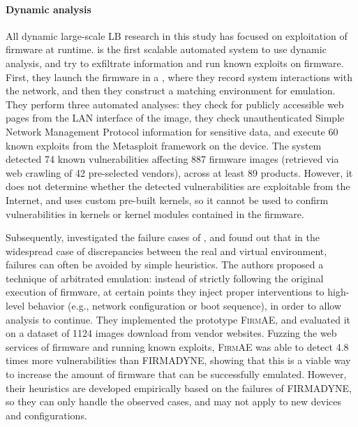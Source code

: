 \paragraph{Dynamic analysis}
All dynamic large-scale LB research in this study has focused on exploitation of firmware at runtime.
 is the first scalable automated system to use dynamic analysis, and try to exfiltrate information and run known exploits on firmware.
First, they launch the firmware in a , where they record system interactions with the network, and then they construct a matching environment for emulation.
They perform three automated analyses: they check for publicly accessible web pages from the LAN interface of the image, they check unauthenticated Simple Network Management Protocol information for sensitive data, and execute \num{60} known exploits from the Metasploit framework on the device.
The system detected \num{74} known vulnerabilities affecting \num{887} firmware images (retrieved via web crawling of \num{42} pre-selected vendors), across at least \num{89} products.
However, it does not determine whether the detected vulnerabilities are exploitable from the Internet, and uses custom pre-built kernels, so it cannot be used to confirm vulnerabilities in kernels or kernel modules contained in the firmware.

Subsequently,  investigated the failure cases of , and found out that in the widespread case of discrepancies between the real and virtual environment, failures can often be avoided by simple heuristics.
The authors proposed a technique of arbitrated emulation: instead of strictly following the original execution of firmware, at certain points they inject proper interventions to high-level behavior (e.g., network configuration or boot sequence), in order to allow analysis to continue.
They implemented the prototype \textsc{FirmAE}, and evaluated it on a dataset of \num{1124} images download from vendor websites.
Fuzzing the web services of firmware and running known exploits, \textsc{FirmAE} was able to detect 4.8 times more vulnerabilities than \textsc{FIRMADYNE}, showing that this is a viable way to increase the amount of firmware that can be successfully emulated.
However, their heuristics are developed empirically based on the failures of \textsc{FIRMADYNE}, so they can only handle the observed cases, and may not apply to new devices and configurations.


